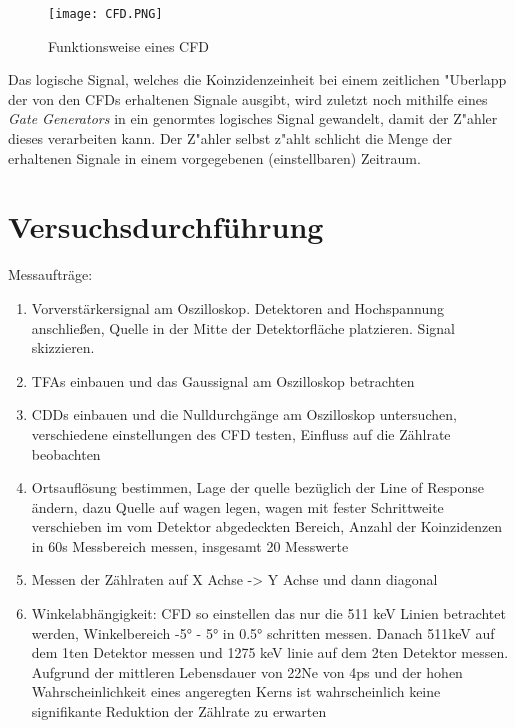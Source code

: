 \documentclass{article}
\begin{document}
\begin{figure}[H]
	\centering
	\texttt{[image: CFD.PNG]}
	\caption[Funktionsweise eines CFD]{Funktionsweise eines CFD\footnotemark}
	\label{figCFD}
\end{figure}

Das logische Signal, welches die Koinzidenzeinheit bei einem zeitlichen "Uberlapp der von den CFDs erhaltenen Signale ausgibt, wird zuletzt noch mithilfe eines \textit{Gate Generators} in ein genormtes logisches Signal gewandelt, damit der Z"ahler dieses verarbeiten kann. Der Z"ahler selbst z"ahlt schlicht die Menge der erhaltenen Signale in einem vorgegebenen (einstellbaren) Zeitraum.



    \section{Versuchsdurchführung}
        Messaufträge:
        \begin{enumerate}
            \item Vorverstärkersignal am Oszilloskop. Detektoren and Hochspannung anschließen, Quelle in der Mitte der Detektorfläche platzieren. Signal skizzieren.
            \item TFAs einbauen und das Gaussignal am Oszilloskop betrachten
            \item CDDs einbauen und die Nulldurchgänge am Oszilloskop untersuchen, verschiedene einstellungen des CFD testen, Einfluss auf die Zählrate beobachten
            \item Ortsauflösung bestimmen, Lage der quelle bezüglich der Line of Response ändern, dazu Quelle auf wagen legen, wagen mit fester Schrittweite verschieben
            im vom Detektor abgedeckten Bereich, Anzahl der Koinzidenzen in 60s Messbereich messen, insgesamt 20 Messwerte
            \item Messen der Zählraten auf X Achse -> Y Achse und dann diagonal
            \item Winkelabhängigkeit: CFD so einstellen das nur die 511 keV Linien betrachtet werden, Winkelbereich -5° - 5° in 0.5° schritten messen.
            Danach 511keV auf dem 1ten Detektor messen und 1275 keV linie auf dem 2ten Detektor messen. Aufgrund der mittleren Lebensdauer von 22Ne von 4ps und der
            hohen Wahrscheinlichkeit eines angeregten Kerns ist wahrscheinlich keine signifikante Reduktion der Zählrate zu erwarten
        \end{enumerate}
\end{document}
